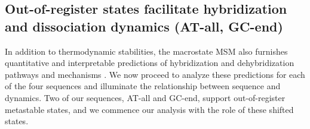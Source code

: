 \documentclass[journal=jpcbfk,manuscript=article]{achemso}
\newcommand*{\rood}[1]{{\color{red}{#1}}}
\begin{document}
\subsection{Out-of-register states facilitate hybridization and dissociation dynamics (AT-all, GC-end)}

In addition to thermodynamic stabilities, the macrostate MSM also furnishes quantitative and interpretable predictions of hybridization and dehybridization pathways and mechanisms \rood{at the sequence melting temperatures}. \rood{It should be noted that because we are using a reversible MSM framework, detailed balance is enforced by construction.} We now proceed to analyze these predictions for each of the four sequences and illuminate the relationship between sequence and dynamics. Two of our sequences, AT-all and GC-end, support out-of-register metastable states, and we commence our analysis with the role of these shifted states.
\end{document}
